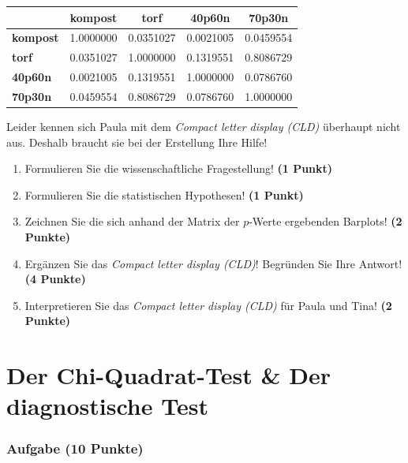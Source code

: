 \documentclass[a4paper, 9pt]{scrartcl}\usepackage[]{graphicx}\usepackage[]{xcolor}
\newenvironment{knitrout}{}{} %
\begin{document}
\begin{knitrout}
\color{fgcolor}\begin{table}[!h]
\centering\begingroup\fontsize{10}{12}\selectfont

\begin{tabular}{>{}lcccc}
\toprule
\textbf{ } & \textbf{kompost} & \textbf{torf} & \textbf{40p60n} & \textbf{70p30n}\\
\midrule
\textbf{kompost} & 1.0000000 & 0.0351027 & 0.0021005 & 0.0459554\\
\textbf{torf} & 0.0351027 & 1.0000000 & 0.1319551 & 0.8086729\\
\textbf{40p60n} & 0.0021005 & 0.1319551 & 1.0000000 & 0.0786760\\
\textbf{70p30n} & 0.0459554 & 0.8086729 & 0.0786760 & 1.0000000\\
\bottomrule
\end{tabular}
\endgroup{}
\end{table}

\end{knitrout}

Leider kennen sich Paula mit dem \textit{Compact letter display (CLD)} überhaupt nicht aus. Deshalb braucht sie bei der Erstellung Ihre Hilfe!

\begin{enumerate}
  \item Formulieren Sie die wissenschaftliche Fragestellung! \textbf{(1 Punkt)}
  \item Formulieren Sie die statistischen Hypothesen! \textbf{(1 Punkt)}
\item Zeichnen Sie die sich anhand der Matrix der $p$-Werte ergebenden Barplots! \textbf{(2 Punkte)}
\item Ergänzen Sie das \textit{Compact letter display (CLD)}! Begründen Sie Ihre Antwort! \textbf{(4 Punkte)}
\item Interpretieren Sie das \textit{Compact letter display (CLD)} für Paula und Tina! \textbf{(2 Punkte)} 
\end{enumerate}

 
\clearpage
\part{Der Chi-Quadrat-Test \& Der diagnostische Test}

\section{Aufgabe \hfill (10 Punkte)}
\end{document}
